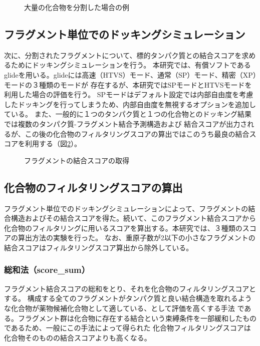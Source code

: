 \begin{figure}[htp]
 \begin{center}
  \caption{大量の化合物を分割した場合の例}
  \label{fig:decomposition_amount}
 \end{center}
\end{figure}

\subsection{フラグメント単位でのドッキングシミュレーション}
次に、分割されたフラグメントについて、標的タンパク質との結合スコアを求めるためにドッキングシミュレーションを行う。
本研究では、有償ソフトであるglide\citetodo{}を用いる。glideには高速（HTVS）モード、通常（SP）モード、精密（XP）モードの３種類のモードが
存在するが、本研究ではSPモードとHTVSモードを利用した場合の評価を行う。
SPモードはデフォルト設定では内部自由度を考慮したドッキングを行ってしまうため、内部自由度を無視するオプションを追加している。
また、一般的に１つのタンパク質と１つの化合物とのドッキング結果では複数のタンパク質-フラグメント結合予測構造および
結合スコアが出力されるが、この後の化合物のフィルタリングスコアの算出ではこのうち最良の結合スコアを利用する（図\ref{fig:fragment_result}）。

\begin{figure}[htp]
 \begin{center}
  \caption{フラグメントの結合スコアの取得}
  \label{fig:fragment_result}
 \end{center}
\end{figure}

\subsection{化合物のフィルタリングスコアの算出}
フラグメント単位でのドッキングシミュレーションによって、フラグメントの結合構造およびその結合スコアを得た。続いて、このフラグメント結合スコアから
化合物のフィルタリングに用いるスコアを算出する。本研究では、３種類のスコアの算出方法の実験を行った。
なお、重原子数が2以下の小さなフラグメントの結合スコアはフィルタリングスコア算出から除外している。

\subsubsection{総和法（score\_sum）}
フラグメント結合スコアの総和をとり、それを化合物のフィルタリングスコアとする。
構成する全てのフラグメントがタンパク質と良い結合構造を取れるような化合物が薬物候補化合物として適している、として評価を高くする手法
である。フラグメント群は化合物に存在する結合という束縛条件を一部緩和したものであるため、一般にこの手法によって得られた
化合物フィルタリングスコアは化合物そのものの結合スコアよりも高くなる。

